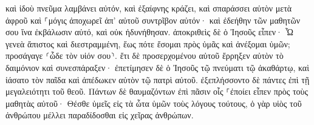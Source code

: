 \documentclass{openreader}
\begin{document}
καὶ ἰδοὺ πνεῦμα λαμβάνει αὐτόν, καὶ ἐξαίφνης κράζει, καὶ σπαράσσει αὐτὸν μετὰ ἀφροῦ καὶ ⸀μόγις ἀποχωρεῖ ἀπ’ αὐτοῦ συντρῖβον αὐτόν· 
καὶ ἐδεήθην τῶν μαθητῶν σου ἵνα ἐκβάλωσιν αὐτό, καὶ οὐκ ἠδυνήθησαν. 
ἀποκριθεὶς δὲ ὁ Ἰησοῦς εἶπεν· Ὦ γενεὰ ἄπιστος καὶ διεστραμμένη, ἕως πότε ἔσομαι πρὸς ὑμᾶς καὶ ἀνέξομαι ὑμῶν; προσάγαγε ⸂ὧδε τὸν υἱόν σου⸃. 
ἔτι δὲ προσερχομένου αὐτοῦ ἔρρηξεν αὐτὸν τὸ δαιμόνιον καὶ συνεσπάραξεν· ἐπετίμησεν δὲ ὁ Ἰησοῦς τῷ πνεύματι τῷ ἀκαθάρτῳ, καὶ ἰάσατο τὸν παῖδα καὶ ἀπέδωκεν αὐτὸν τῷ πατρὶ αὐτοῦ. 
ἐξεπλήσσοντο δὲ πάντες ἐπὶ τῇ μεγαλειότητι τοῦ θεοῦ. Πάντων δὲ θαυμαζόντων ἐπὶ πᾶσιν οἷς ⸀ἐποίει εἶπεν πρὸς τοὺς μαθητὰς αὐτοῦ· 
Θέσθε ὑμεῖς εἰς τὰ ὦτα ὑμῶν τοὺς λόγους τούτους, ὁ γὰρ υἱὸς τοῦ ἀνθρώπου μέλλει παραδίδοσθαι εἰς χεῖρας ἀνθρώπων. 
\end{document}
